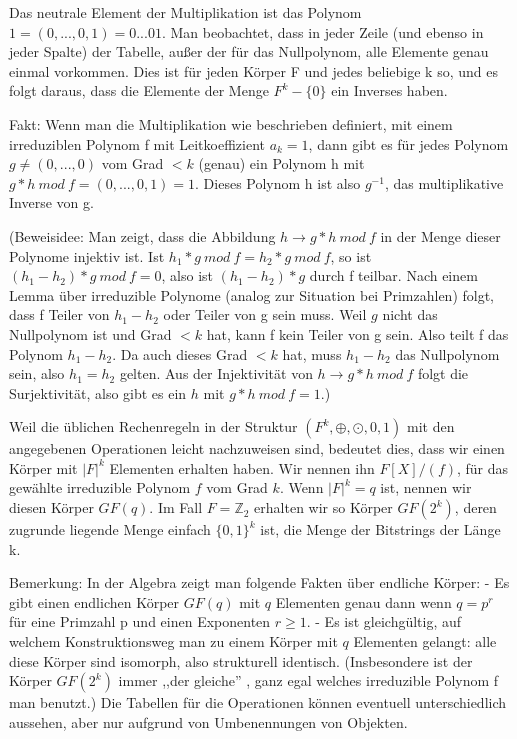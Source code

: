 \documentclass[a4paper]{article}
\begin{document}
\begin{multicols}{3}
    Das neutrale Element der Multiplikation ist das Polynom $1=(0,..., 0 ,1) = 0... 01$. Man beobachtet, dass in jeder Zeile (und ebenso in jeder Spalte) der Tabelle, außer der für das Nullpolynom, alle Elemente genau einmal vorkommen. Dies ist für jeden Körper F und jedes beliebige k so, und es folgt daraus, dass die Elemente der Menge $F^k-\{0\}$ ein Inverses haben.

    Fakt: Wenn man die Multiplikation wie beschrieben definiert, mit einem irreduziblen Polynom f mit Leitkoeffizient $a_k=1$, dann gibt es für jedes Polynom $g\not=(0,...,0)$ vom Grad $<k$ (genau) ein Polynom h mit $g*h\ mod\ f=(0,...,0,1)=1$. Dieses Polynom h ist also $g^{-1}$, das multiplikative Inverse von g.

    (Beweisidee: Man zeigt, dass die Abbildung $h\rightarrow g*h\ mod\ f$ in der Menge dieser Polynome injektiv ist. Ist $h_1*g\ mod\ f=h_2*g\ mod\ f$, so ist $(h_1-h_2)*g\ mod\ f= 0$, also ist $(h_1-h_2)*g$ durch f teilbar. Nach einem Lemma über irreduzible Polynome (analog zur Situation bei Primzahlen) folgt, dass f Teiler von $h_1-h_2$ oder Teiler von g sein muss. Weil $g$ nicht das Nullpolynom ist und Grad $<k$ hat, kann f kein Teiler von g sein. Also teilt f das Polynom $h_1-h_2$. Da auch dieses Grad $<k$ hat, muss $h_1-h_2$ das Nullpolynom sein, also $h_1=h_2$ gelten. Aus der Injektivität von $h\rightarrow g*h\ mod\ f$ folgt die Surjektivität, also gibt es ein $h$ mit $g*h\ mod\ f=1$.)

    Weil die üblichen Rechenregeln in der Struktur $(F^k,\oplus,\odot,0,1)$ mit den angegebenen Operationen leicht nachzuweisen sind, bedeutet dies, dass wir einen Körper mit $|F|^k$ Elementen erhalten haben. Wir nennen ihn $F[X]/(f)$, für das gewählte irreduzible Polynom $f$ vom Grad $k$. Wenn $|F|^k=q$ ist, nennen wir diesen Körper $GF(q)$. Im Fall $F=\mathbb{Z}_2$ erhalten wir so Körper $GF(2^k)$, deren zugrunde liegende Menge einfach $\{0,1\}^k$ ist, die Menge der Bitstrings der Länge k.

    Bemerkung: In der Algebra zeigt man folgende Fakten über endliche Körper:
    - Es gibt einen endlichen Körper $GF(q)$ mit $q$ Elementen genau dann wenn $q=p^r$ für eine Primzahl p und einen Exponenten $r\geq 1$.
    - Es ist gleichgültig, auf welchem Konstruktionsweg man zu einem Körper mit $q$ Elementen gelangt: alle diese Körper sind isomorph, also strukturell identisch. (Insbesondere ist der Körper $GF(2^k)$ immer ,,der gleiche'' , ganz egal welches irreduzible Polynom f man benutzt.) Die Tabellen für die Operationen können eventuell unterschiedlich aussehen, aber nur aufgrund von Umbenennungen von Objekten.


\end{multicols}
\end{document}
